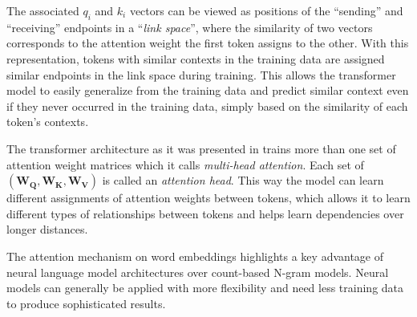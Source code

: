 The associated $q_i$ and $k_i$ vectors can be viewed as positions of the ``sending'' and ``receiving'' endpoints in a ``\textit{link space}'', where the similarity of two vectors corresponds to the attention weight the first token assigns to the other. With this representation, tokens with similar contexts in the training data are assigned similar endpoints in the link space during training. This allows the transformer model to easily generalize from the training data and predict similar context even if they never occurred in the training data, simply based on the similarity of each token's contexts.

The transformer architecture as it was presented in \cite{VaswaniSPUJGKP17} trains more than one set of attention weight matrices which it calls \textit{multi-head attention}. Each set of $\mathbf{(W_Q, W_K, W_V)}$ is called an \textit{attention head}. This way the model can learn different assignments of attention weights between tokens, which allows it to learn different types of relationships between tokens and helps learn dependencies over longer distances.

The attention mechanism on word embeddings highlights a key advantage of neural language model architectures over count-based N-gram models. Neural models can generally be applied with more flexibility and need less training data to produce sophisticated results. 